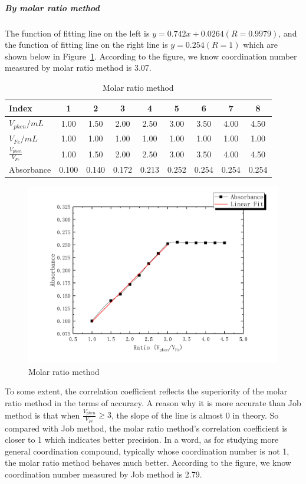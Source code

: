 \documentclass[journal=jacsat,manuscript=article]{achemso}
\begin{document}
\subparagraph{By molar ratio method}

 The function of fitting line on the left is $y=0.742x+0.0264(R=0.9979)$, and the function of fitting line on the right line is $y=0.254(R=1)$ which are shown below in Figure~\ref{fig2}. According to the figure, we know coordination number measured by molar ratio method is 3.07.

\begin{table}[H]
    \caption{Molar ratio method}
    \label{tab.Mrm}
    \begin{tabular}{lcccccccc}
    \toprule
    Index         &  1  &  2  &  3  &  4  &  5  &  6  &  7  &  8  \\
    \midrule
    $V_{phen}/mL$ &1.00 &1.50 &2.00 &2.50 &3.00 &3.50 &4.00 &4.50 \\
    $V_{Fe}/mL$   &1.00 &1.00 &1.00 &1.00 &1.00 &1.00 &1.00 &1.00 \\
    $\frac{V_{phen}}{V_{Fe}}$
                  &1.00 &1.50 &2.00 &2.50 &3.00 &3.50 &4.00 &4.50 \\
    Absorbance    &0.100&0.140&0.172&0.213&0.252&0.254&0.254&0.254\\
    \bottomrule
    \end{tabular}
\end{table}

\begin{figure}[H]
    \includegraphics[width=\linewidth]{Fig2.pdf}
    \caption{Molar ratio method}
    \label{fig2}
\end{figure}

To some extent, the correlation coefficient reflects the superiority of the molar ratio method in the terms of accuracy. A reason why it is more accurate than Job method is that when $\frac{V_{phen}}{V_{Fe}}\geq3$, the slope of the line is almost 0 in theory. So compared with Job method, the molar ratio method’s correlation coefficient is closer to 1 which indicates better precision. In a word, as for studying more general coordination compound, typically whose coordination number is not 1, the molar ratio method behaves much better. According to the figure, we know coordination number measured by Job method is 2.79.
\end{document}
